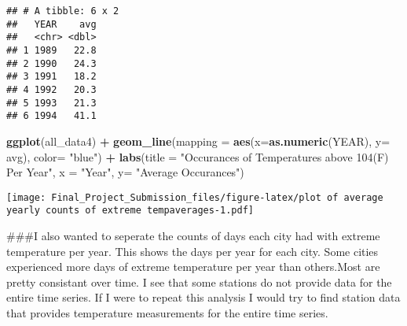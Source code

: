 \documentclass[]{article}
\newenvironment{Shaded}{\begin{snugshade}}{\end{snugshade}}
\newcommand{\DataTypeTok}[1]{\textcolor[rgb]{0.13,0.29,0.53}{#1}}
\newcommand{\DecValTok}[1]{\textcolor[rgb]{0.00,0.00,0.81}{#1}}
\newcommand{\KeywordTok}[1]{\textcolor[rgb]{0.13,0.29,0.53}{\textbf{#1}}}
\newcommand{\NormalTok}[1]{#1}
\newcommand{\OperatorTok}[1]{\textcolor[rgb]{0.81,0.36,0.00}{\textbf{#1}}}
\newcommand{\StringTok}[1]{\textcolor[rgb]{0.31,0.60,0.02}{#1}}
\begin{document}
\begin{verbatim}
## # A tibble: 6 x 2
##   YEAR    avg
##   <chr> <dbl>
## 1 1989   22.8
## 2 1990   24.3
## 3 1991   18.2
## 4 1992   20.3
## 5 1993   21.3
## 6 1994   41.1
\end{verbatim}

\begin{Shaded}
\begin{Highlighting}[]
\KeywordTok{ggplot}\NormalTok{(all_data4) }\OperatorTok{+}
\StringTok{  }\KeywordTok{geom_line}\NormalTok{(}\DataTypeTok{mapping =} \KeywordTok{aes}\NormalTok{(}\DataTypeTok{x=}\KeywordTok{as.numeric}\NormalTok{(YEAR), }\DataTypeTok{y=}\NormalTok{ avg), }\DataTypeTok{color=} \StringTok{"blue"}\NormalTok{) }\OperatorTok{+}
\StringTok{  }\KeywordTok{labs}\NormalTok{(}\DataTypeTok{title =} \StringTok{"Occurances of Temperatures above 104(F) Per Year"}\NormalTok{, }\DataTypeTok{x =} \StringTok{"Year"}\NormalTok{, }\DataTypeTok{y=} \StringTok{"Average Occurances"}\NormalTok{)}
\end{Highlighting}
\end{Shaded}

\texttt{[image: Final\_Project\_Submission\_files/figure-latex/plot of average yearly counts of extreme tempaverages-1.pdf]}

\#\#\#I also wanted to seperate the counts of days each city had with
extreme temperature per year. This shows the days per year for each
city. Some cities experienced more days of extreme temperature per year
than others.Most are pretty consistant over time. I see that some
stations do not provide data for the entire time series. If I were to
repeat this analysis I would try to find station data that provides
temperature measurements for the entire time series.

\begin{Shaded}
\end{Shaded}
\end{document}

